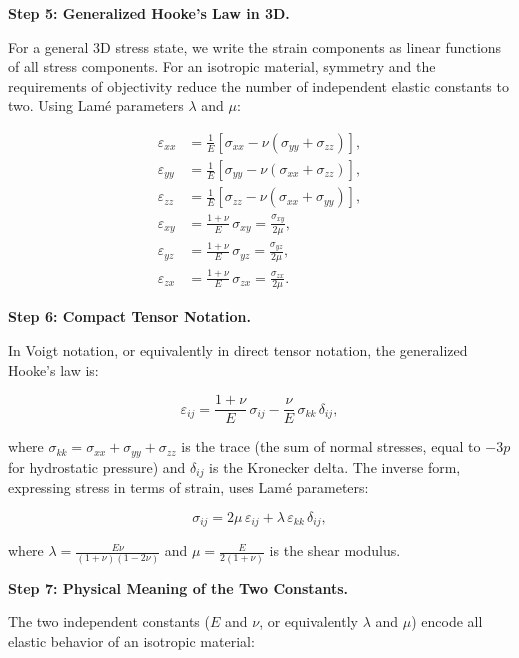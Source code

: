 \textbf{Step 5: Generalized Hooke's Law in 3D.}

For a general 3D stress state, we write the strain components as linear functions of all stress components. For an isotropic material, symmetry and the requirements of objectivity reduce the number of independent elastic constants to two. Using Lam\'e parameters $\lambda$ and $\mu$:

\begin{align}
\varepsilon_{xx} &= \frac{1}{E}\left[\sigma_{xx} - \nu(\sigma_{yy} + \sigma_{zz})\right], \\
\varepsilon_{yy} &= \frac{1}{E}\left[\sigma_{yy} - \nu(\sigma_{xx} + \sigma_{zz})\right], \\
\varepsilon_{zz} &= \frac{1}{E}\left[\sigma_{zz} - \nu(\sigma_{xx} + \sigma_{yy})\right], \\
\varepsilon_{xy} &= \frac{1 + \nu}{E}\,\sigma_{xy} = \frac{\sigma_{xy}}{2\mu}, \\
\varepsilon_{yz} &= \frac{1 + \nu}{E}\,\sigma_{yz} = \frac{\sigma_{yz}}{2\mu}, \\
\varepsilon_{zx} &= \frac{1 + \nu}{E}\,\sigma_{zx} = \frac{\sigma_{zx}}{2\mu}.
\end{align}

\textbf{Step 6: Compact Tensor Notation.}

In Voigt notation, or equivalently in direct tensor notation, the generalized Hooke's law is:

\begin{equation}
\varepsilon_{ij} = \frac{1+\nu}{E}\,\sigma_{ij} - \frac{\nu}{E}\,\sigma_{kk}\,\delta_{ij},
\end{equation}

where $\sigma_{kk} = \sigma_{xx} + \sigma_{yy} + \sigma_{zz}$ is the trace (the sum of normal stresses, equal to $-3p$ for hydrostatic pressure) and $\delta_{ij}$ is the Kronecker delta. The inverse form, expressing stress in terms of strain, uses Lam\'e parameters:

\begin{equation}
\sigma_{ij} = 2\mu\,\varepsilon_{ij} + \lambda\,\varepsilon_{kk}\,\delta_{ij},
\end{equation}

where $\lambda = \frac{E\nu}{(1+\nu)(1-2\nu)}$ and $\mu = \frac{E}{2(1+\nu)}$ is the shear modulus.

\textbf{Step 7: Physical Meaning of the Two Constants.}

The two independent constants ($E$ and $\nu$, or equivalently $\lambda$ and $\mu$) encode all elastic behavior of an isotropic material:

